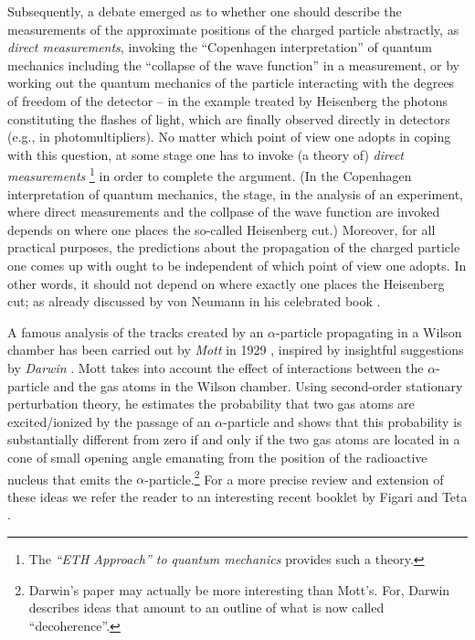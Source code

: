 \documentclass[11pt]{article}
\begin{document}
Subsequently, a debate emerged as to whether one should describe the measurements of the approximate positions of the 
charged particle abstractly, as \textit{direct measurements}, invoking the ``Copenhagen interpretation'' of 
quantum mechanics including the ``collapse of the wave function'' in a measurement, or by working out the 
quantum mechanics of the particle interacting with the degrees of freedom 
of the detector -- in the example treated by Heisenberg the photons constituting the flashes of light, which are finally 
observed directly in detectors (e.g., in photomultipliers). No matter which point of view one adopts in coping with
this question, at some stage one has to invoke (a theory of) \textit{direct measurements}
\footnote{The \textit{``ETH Approach'' to quantum mechanics} \cite{Fr} provides such a theory.} 
in order to complete the argument. (In the Copenhagen interpretation of quantum mechanics, the stage, 
in the analysis of an experiment, where direct measurements and the collpase of the wave function are invoked 
depends on where one places the so-called Heisenberg cut.) Moreover, for all practical purposes, the predictions 
about the propagation of the charged particle one comes up with ought to be independent of which point 
of view one adopts. In other words, it should not depend on where exactly one places the Heisenberg cut; as already discussed by von Neumann in his celebrated book \cite{vN}. 

A famous analysis of the tracks created by an $\alpha$-particle propagating in a Wilson chamber has been 
carried out by \textit{ Mott} in 1929 \cite{Mott}, inspired by insightful suggestions by \textit{Darwin} \cite{Darwin}. 
Mott takes into account the effect of interactions between the $\alpha$-particle and the gas atoms in the 
Wilson chamber. Using second-order stationary perturbation theory, he estimates the probability that two gas 
atoms are excited/ionized by the passage of an $\alpha$-particle and shows that this probability is substantially different 
from zero if and only if the two gas atoms are located in a cone of small opening angle emanating from the position 
of the radioactive nucleus that emits the $\alpha$-particle.\footnote{Darwin's paper may actually be more interesting 
than Mott's. For, Darwin describes ideas that amount to an outline of what is now called ``decoherence''.} For a more precise review and extension of these ideas we refer the reader to an interesting recent booklet by Figari and Teta \cite{FigTeta}.
\end{document}
